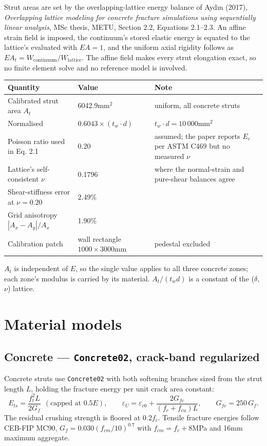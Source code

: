 \documentclass[11pt,a4paper]{article}
\begin{document}
Strut areas are set by the overlapping-lattice energy balance of Aydın (2017), \emph{Overlapping
lattice modeling for concrete fracture simulations using sequentially linear analysis}, MSc thesis,
METU, Section 2.2, Equations 2.1--2.3. An affine strain field is imposed, the continuum's stored
elastic energy is equated to the lattice's evaluated with $EA = 1$, and the uniform axial rigidity
follows as $EA_t = W_{\text{continuum}} / W_{\text{lattice}}$. The affine field makes every strut
elongation exact, so no finite element solve and no reference model is involved.

\begin{tabularx}{\textwidth}{@{}p{50mm}p{38mm}>{\raggedright\arraybackslash}X@{}}
\toprule
\textbf{Quantity} & \textbf{Value} & \textbf{Note} \\
\midrule
Calibrated strut area $A_t$      & 6042.9\unit{mm$^2$} & uniform, all concrete struts \\
Normalised                       & $0.6043 \times (t_w \cdot d)$ & $t_w \cdot d = 10\,000$\unit{mm$^2$} \\
Poisson ratio used in Eq. 2.1    & 0.20 & assumed; the paper reports $E_c$ per ASTM C469 but no measured $\nu$ \\
Lattice's self-consistent $\nu$  & 0.1796 & where the normal-strain and pure-shear balances agree \\
Shear-stiffness error at $\nu=0.20$ & 2.49\% & \\
Grid anisotropy $|A_x - A_y|/A_x$ & 1.90\% & \\
Calibration patch                & wall rectangle $1000 \times 3000$\unit{mm} & pedestal excluded \\
\bottomrule
\end{tabularx}

$A_t$ is independent of $E$, so the single value applies to all three concrete zones; each zone's
modulus is carried by its material. $A_t/(t_w d)$ is a constant of the ($\delta$, $\nu$) lattice.

\section{Material models}

\subsection{Concrete --- \texttt{Concrete02}, crack-band regularized}

Concrete struts use \texttt{Concrete02} with both softening branches sized from the strut length
$L$, holding the fracture energy per unit crack area constant:
\[
E_{ts} = \frac{f_t^2 L}{2 G_f} \ \ (\text{capped at } 0.5E), \qquad
\varepsilon_U = \varepsilon_{c0} + \frac{2 G_{fc}}{(f_c + f_{cu})L}, \qquad
G_{fc} = 250\,G_f .
\]
The residual crushing strength is floored at $0.2 f_c$. Tensile fracture energies follow CEB-FIP
MC90, $G_f = 0.030 (f_{cm}/10)^{0.7}$ with $f_{cm} = f_c + 8$\unit{MPa} and 16\unit{mm} maximum
aggregate.
\end{document}

